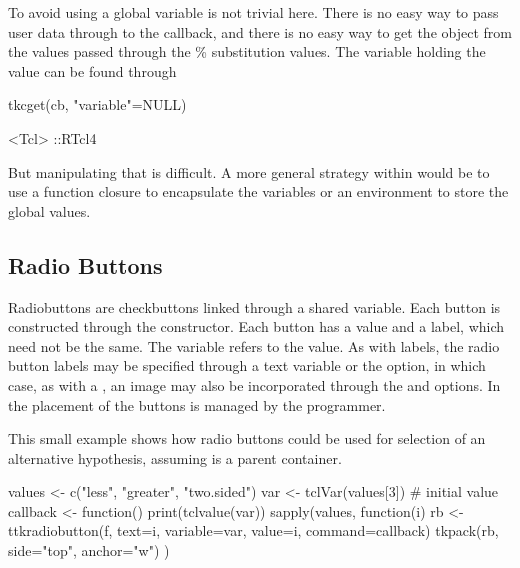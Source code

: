 To avoid using a global variable is not trivial here. There is no easy way to pass user data through to the callback, and there is no easy way to get the \R\/ object from the values passed through the \% substitution values. The variable holding the value can be found through
\begin{Schunk}
\begin{Sinput}
 tkcget(cb, "variable"=NULL)
\end{Sinput}
\begin{Soutput}
<Tcl> ::RTcl4 
\end{Soutput}
\end{Schunk}

But manipulating that is difficult.  A more general strategy within
\R\/ would be to use a function closure to encapsulate the variables
or an environment to store the global values.



\subsection{Radio Buttons}
\label{sec:tcltk:radio-buttons}

Radiobuttons are checkbuttons linked through a shared \TCL\/ variable. Each button is constructed
through the  constructor. Each button has a value and a
label, which need not be the same. The variable refers to the
value. As with labels, the radio button labels may be specified
through a text variable or the  option,
in which case, as with a , an image may also be incorporated through the
 and  options. In \TK\/ the placement of the buttons is managed by the programmer.


This small example shows how radio buttons could be used for selection
of an alternative hypothesis, assuming  is a parent container.

\begin{Schunk}
\begin{Sinput}
 values <- c("less", "greater", "two.sided")
 var <- tclVar(values[3])                # initial value
 callback <- function() print(tclvalue(var))
 sapply(values, function(i) {
   rb <- ttkradiobutton(f, text=i, variable=var, 
                        value=i, command=callback)
   tkpack(rb, side="top", anchor="w")
 })
\end{Sinput}
\end{Schunk}


